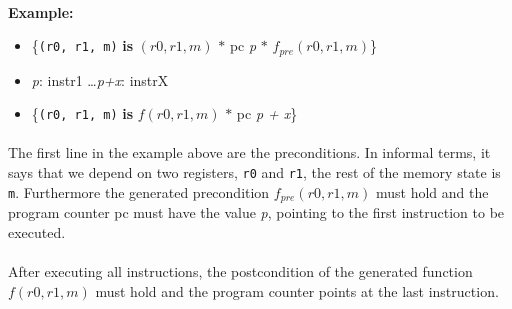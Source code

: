 \documentclass[fleqn]{kththesis}
\begin{document}
\paragraph{}
\textbf{Example:}

\begin{itemize}[label={}]
\item \{\verb|(r0, r1, m)| \textbf{is} $(r0, r1, m)$ $\ast$ pc \emph{p} $\ast$ $f_{pre}(r0, r1, m)$\} 
\item \emph{p}: instr1 \dots \emph{p+x}: instrX 
\item \{\verb|(r0, r1, m)| \textbf{is} $f(r0, r1, m)$ $\ast$ pc \emph{p + x}\} 
\end{itemize}

\paragraph{}
The first line in the example above are the preconditions. In informal terms, it says that we depend on two registers, \verb|r0| and \verb|r1|, the rest of the memory state is \verb|m|. Furthermore the generated precondition $f_{pre}(r0, r1, m)$ must hold and the program counter pc must have the value \emph{p}, pointing to the first instruction to be executed.

\paragraph{}
After executing all instructions, the postcondition of the generated function $f(r0, r1, m)$ must hold and the program counter points at the last instruction.

\end{document}
